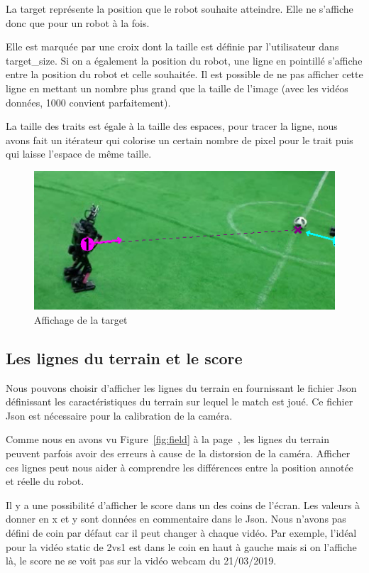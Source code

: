 La target représente la position que le robot souhaite atteindre. Elle ne s'affiche donc que pour un robot à la fois.
\bigskip

Elle est marquée par une croix dont la taille est définie par l'utilisateur dans target\_size. Si on a également la position du robot, une ligne en pointillé s'affiche entre la position du robot et celle souhaitée. 
Il est possible de ne pas afficher cette ligne en mettant un nombre plus grand que la taille de l'image (avec les vidéos données, 1000 convient parfaitement).
\bigskip

La taille des traits est égale à la taille des espaces, pour tracer la ligne, nous avons fait un itérateur qui colorise un certain nombre de pixel pour le trait puis qui laisse l'espace de même taille.

\begin{figure}[h] 
\centering 
\includegraphics[scale = 0.5]{images/robottarget.png}
    \caption{Affichage de la target}
    \label{fig:target}
\end{figure}

\subsection{Les lignes du terrain et le score}

Nous pouvons choisir d'afficher les lignes du terrain en fournissant le fichier Json définissant les caractéristiques du terrain sur lequel le match est joué. 
Ce fichier Json est nécessaire pour la calibration de la caméra.
\bigskip

Comme nous en avons vu Figure~\ref{fig:field} à la page~\pageref{fig:field}, les lignes du terrain peuvent parfois avoir des erreurs à cause de la distorsion de la caméra.
Afficher ces lignes peut nous aider à comprendre les différences entre la position annotée et réelle du robot.
\bigskip

Il y a une possibilité d'afficher le score dans un des coins de l'écran. Les valeurs à donner en x et y sont données en commentaire dans le Json. Nous n'avons pas défini de coin par défaut car il peut changer à chaque vidéo. Par exemple, l'idéal pour la vidéo static de 2vs1 est dans le coin en haut à gauche mais si on l'affiche là, le score ne se voit pas sur la vidéo webcam du 21/03/2019.
\bigskip

